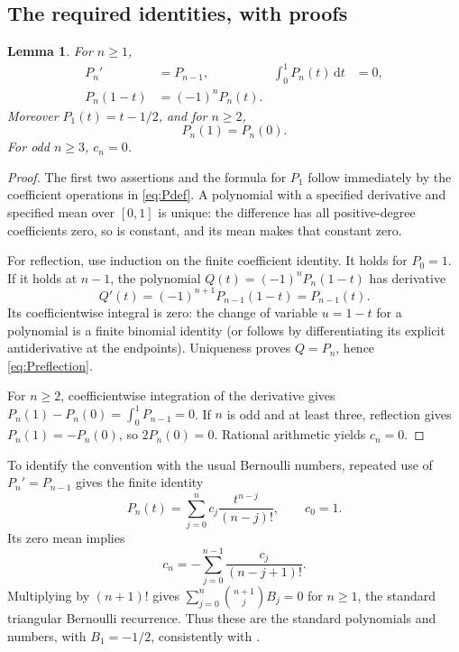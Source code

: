 \documentclass[11pt]{article}
\newtheorem{lemma}[theorem]{Lemma}
\theoremstyle{definition}
\newcommand{\dd}{\,\mathrm{d}}
\begin{document}
\subsection{The required identities, with proofs}

\begin{lemma}\label{lem:Pproperties}
For \(n\ge1\),
\begin{align}
 P_n'&=P_{n-1},&\int_0^1P_n(t)\dd t&=0,\label{eq:Pderiv}\\
 P_n(1-t)&=(-1)^nP_n(t).&&\label{eq:Preflection}
\end{align}
Moreover \(P_1(t)=t-1/2\), and for \(n\ge2\),
\begin{equation}
 P_n(1)=P_n(0).\label{eq:Pendpoint}
\end{equation}
For odd \(n\ge3\), \(c_n=0\).
\end{lemma}
\begin{proof}
The first two assertions and the formula for \(P_1\) follow immediately
by the coefficient operations in \eqref{eq:Pdef}.  A polynomial with a
specified derivative and specified mean over \([0,1]\) is unique:
the difference has all positive-degree coefficients zero, so is
constant, and its mean makes that constant zero.

For reflection, use induction on the finite coefficient identity.
It holds for \(P_0=1\).  If it holds at \(n-1\), the polynomial
\(Q(t)=(-1)^nP_n(1-t)\) has derivative
\[
 Q'(t)=(-1)^{n+1}P_{n-1}(1-t)=P_{n-1}(t).
\]
Its coefficientwise integral is zero: the change of variable
\(u=1-t\) for a polynomial is a finite binomial identity (or follows
by differentiating its explicit antiderivative at the endpoints).
Uniqueness proves \(Q=P_n\), hence \eqref{eq:Preflection}.

For \(n\ge2\), coefficientwise integration of the derivative gives
\(P_n(1)-P_n(0)=\int_0^1P_{n-1}=0\).  If \(n\) is odd and at least
three, reflection gives \(P_n(1)=-P_n(0)\), so \(2P_n(0)=0\).
Rational arithmetic yields \(c_n=0\).
\end{proof}

To identify the convention with the usual Bernoulli numbers, repeated
use of \(P_n'=P_{n-1}\) gives the finite identity
\[
 P_n(t)=\sum_{j=0}^n c_j\frac{t^{n-j}}{(n-j)!},
 \qquad c_0=1.
\]
Its zero mean implies
\[
 c_n=-\sum_{j=0}^{n-1}\frac{c_j}{(n-j+1)!}.
\]
Multiplying by \((n+1)!\) gives
\(\sum_{j=0}^{n}\binom{n+1}{j}B_j=0\) for \(n\ge1\), the
standard triangular Bernoulli recurrence.  Thus these are the standard
polynomials and numbers, with \(B_1=-1/2\), consistently with
\cite{dlmfbernoulli,dlmfproperties}.
\end{document}
